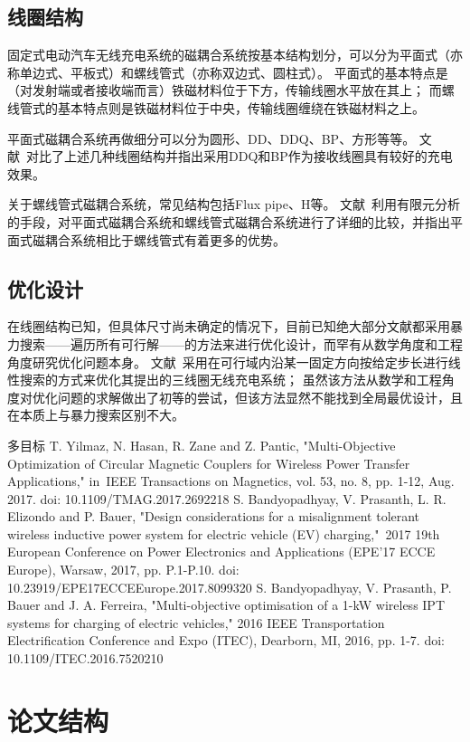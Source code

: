 \documentclass[index]{subfiles}
\begin{document}
\subsection{线圈结构}
固定式电动汽车无线充电系统的磁耦合系统按基本结构划分，可以分为平面式（亦称单边式、平板式）和螺线管式（亦称双边式、圆柱式）\cite{高大威2015}。
平面式的基本特点是（对发射端或者接收端而言）铁磁材料位于下方，传输线圈水平放在其上；
而螺线管式的基本特点则是铁磁材料位于中央，传输线圈缠绕在铁磁材料之上。

平面式磁耦合系统再做细分可以分为圆形\cite{budhia2011}、DD\cite{budhia2013}、DDQ\cite{budhia2013}、BP\cite{covic2011}、方形\cite{choi2014}等等。
文献~对比了上述几种线圈结构并指出采用DDQ和BP作为接收线圈具有较好的充电效果。

关于螺线管式磁耦合系统，常见结构包括Flux pipe\cite{budhia2010}、H\cite{takanashi2012}等。
文献~利用有限元分析的手段，对平面式磁耦合系统和螺线管式磁耦合系统进行了详细的比较，并指出平面式磁耦合系统相比于螺线管式有着更多的优势。

\subsection{优化设计}

在线圈结构已知，但具体尺寸尚未确定的情况下，目前已知绝大部分文献\cite{budhia2011,shijo2015,tang2015}都采用暴力搜索——遍历所有可行解——的方法来进行优化设计，而罕有从数学角度和工程角度研究优化问题本身。
文献~采用在可行域内沿某一固定方向按给定步长进行线性搜索的方式来优化其提出的三线圈无线充电系统；
虽然该方法从数学和工程角度对优化问题的求解做出了初等的尝试，但该方法显然不能找到全局最优设计，且在本质上与暴力搜索区别不大。

多目标
T. Yilmaz, N. Hasan, R. Zane and Z. Pantic, "Multi-Objective Optimization of Circular Magnetic Couplers for Wireless Power Transfer Applications," in IEEE Transactions on Magnetics, vol. 53, no. 8, pp. 1-12, Aug. 2017.  doi: 10.1109/TMAG.2017.2692218
S. Bandyopadhyay, V. Prasanth, L. R. Elizondo and P. Bauer, "Design considerations for a misalignment tolerant wireless inductive power system for electric vehicle (EV) charging," 2017 19th European Conference on Power Electronics and Applications (EPE'17 ECCE Europe), Warsaw, 2017, pp. P.1-P.10.  doi: 10.23919/EPE17ECCEEurope.2017.8099320
S. Bandyopadhyay, V. Prasanth, P. Bauer and J. A. Ferreira, "Multi-objective optimisation of a 1-kW wireless IPT systems for charging of electric vehicles," 2016 IEEE Transportation Electrification Conference and Expo (ITEC), Dearborn, MI, 2016, pp. 1-7.  doi: 10.1109/ITEC.2016.7520210

\iffalse
6: budhia2010%
7: takanashi2012%
8: budhia2011%
9: budhia2013%
10: covic2011%
11: choi2014%
bgo4mppt abdelrahman2016
26: budhia2013%
92: zhang2014%
93: budhia2011%
94: budhia2010%
95: takanashi2012%
96: nguyen2014%
97: zaheer2015%
98: haldi2013%
\fi%
\section{论文结构}
\end{document}
